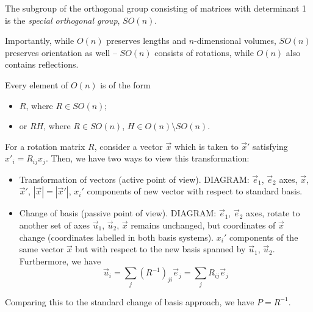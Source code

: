 \documentclass{../template/note}
\begin{document}
    \begin{definition}
        The subgroup of the orthogonal group consisting of matrices with determinant 1 is the \emph{special orthogonal group}, \(SO(n)\).
    \end{definition}
    
    Importantly, while \(O(n)\) preserves lengths and \(n\)-dimensional volumes, \(SO(n)\) preserves orientation as well -- \(SO(n)\) consists of rotations, while \(O(n)\) also contains reflections.

    \begin{proposition}
        Every element of \(O(n)\) is of the form
        \begin{itemize}
            \item \(R\), where \(R \in SO(n)\);
            \item or \(RH\), where \(R \in SO(n)\), \(H \in O(n) \setminus SO(n)\).
        \end{itemize}
    \end{proposition}


    For a rotation matrix \(R\), consider a vector \(\vec x\) which is taken to \(\vec x'\) satisfying \(x'_i = R_{ij}x_j\). Then, we have two ways to view this transformation:
    
    \begin{itemize}
        \item Transformation of vectors (active point of view). 
        DIAGRAM: \(\vec e_1\), \(\vec e_2\) axes, \(\vec x\), \(\vec x'\), \(|\vec x| = |\vec x'|\), \(x_i'\) components of new vector with respect to standard basis.
        \item Change of basis (passive point of view).
        DIAGRAM: \(\vec e_1\), \(\vec e_2\) axes, rotate to another set of axes \(\vec u_1\), \(\vec u_2\), \(\vec x\) remains unchanged, but coordinates of \(\vec x\) change (coordinates labelled in both basis systems). \(x_i'\) components of the same vector \(\vec x\) but with respect to the new basis spanned by \(\vec u_1\), \(\vec u_2\). Furthermore, we have
        \[
            \vec u_i = \sum_j (R^{-1})_{ji} \vec e_j = \sum_j R_{ij} \vec e_j
        \]
    \end{itemize}
    
    \begin{remark*}
        Comparing this to the standard change of basis approach, we have \(P = R^{-1}\).
    \end{remark*}
    
\end{document}
